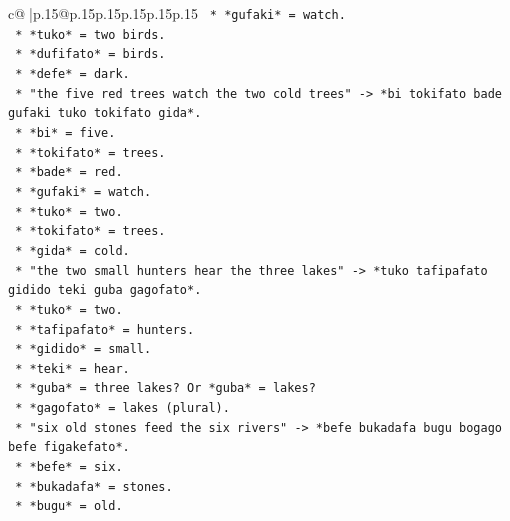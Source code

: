 \documentclass{article}
\begin{document}
{\begin{supertabular}{c@{$\;$}|p{.15\linewidth}@{}p{.15\linewidth}p{.15\linewidth}p{.15\linewidth}p{.15\linewidth}p{.15\linewidth}}
{{{\texttt{                                *   *gufaki* = watch.} \\
\texttt{                                *   *tuko* = two birds.} \\
\texttt{                                *   *dufifato* = birds.} \\
\texttt{                                *   *defe* = dark.} \\
\texttt{                            *   "the five red trees watch the two cold trees" {-}> *bi tokifato bade gufaki tuko tokifato gida*.} \\
\texttt{                                *   *bi* = five.} \\
\texttt{                                *   *tokifato* = trees.} \\
\texttt{                                *   *bade* = red.} \\
\texttt{                                *   *gufaki* = watch.} \\
\texttt{                                *   *tuko* = two.} \\
\texttt{                                *   *tokifato* = trees.} \\
\texttt{                                *   *gida* = cold.} \\
\texttt{                            *   "the two small hunters hear the three lakes" {-}> *tuko tafipafato gidido teki guba gagofato*.} \\
\texttt{                                *   *tuko* = two.} \\
\texttt{                                *   *tafipafato* = hunters.} \\
\texttt{                                *   *gidido* = small.} \\
\texttt{                                *   *teki* = hear.} \\
\texttt{                                *   *guba* = three lakes? Or *guba* = lakes?} \\
\texttt{                                *   *gagofato* = lakes (plural).} \\
\texttt{                            *   "six old stones feed the six rivers" {-}> *befe bukadafa bugu bogago befe figakefato*.} \\
\texttt{                                *   *befe* = six.} \\
\texttt{                                *   *bukadafa* = stones.} \\
\texttt{                                *   *bugu* = old.} \\
}}}
\end{supertabular}}
\end{document}
